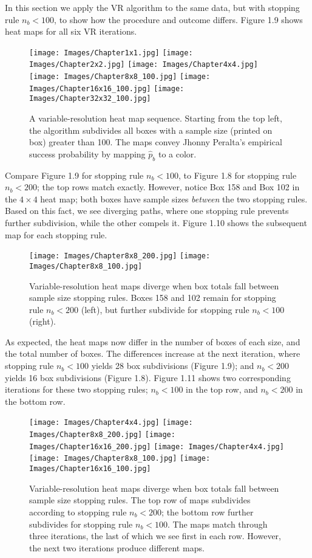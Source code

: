 In this section we apply the VR algorithm to the same data, but with stopping rule $n_{b} < 100$, to show how the procedure and outcome differs. Figure 1.9 shows heat maps for all six VR iterations.
        \begin{figure}[H]
      	\centering
      	\texttt{[image: Images/Chapter1x1.jpg]}
      	\texttt{[image: Images/Chapter2x2.jpg]}
      	\texttt{[image: Images/Chapter4x4.jpg]}
      	\texttt{[image: Images/Chapter8x8\_100.jpg]}
      	\texttt{[image: Images/Chapter16x16\_100.jpg]}
      	\texttt{[image: Images/Chapter32x32\_100.jpg]}
      	\caption{A variable-resolution heat map sequence. Starting from the top left, the algorithm subdivides all boxes with a sample size (printed on box) greater than 100. The maps convey Jhonny Peralta's empirical success probability by mapping $\hat{p}_{b}$ to a color.}
\end{figure} 	
Compare Figure 1.9 for stopping rule $n_{b} < 100$, to Figure 1.8 for stopping rule $n_{b} < 200$; the top rows match exactly. However, notice Box 158 and Box 102 in the $4 \times 4$ heat map; both boxes have sample sizes {\it between} the two stopping rules. Based on this fact, we see diverging paths, where one stopping rule prevents further subdivision, while the other compels it. Figure 1.10 shows the subsequent map for each stopping rule.
        \begin{figure}[H]
      	\centering      
      	\texttt{[image: Images/Chapter8x8\_200.jpg]}
      	\texttt{[image: Images/Chapter8x8\_100.jpg]}
      	\caption{Variable-resolution heat maps diverge when box totals fall between sample size stopping rules. Boxes 158 and 102 remain for stopping rule $n_{b} < 200$ (left), but further subdivide for stopping rule $n_{b} < 100$ (right).}
\end{figure} 
As expected, the heat maps now differ in the number of boxes of each size, and the total number of boxes. The differences increase at the next iteration, where stopping rule $n_{b} < 100$ yields 28 box subdivisions (Figure 1.9); and $n_{b} < 200$ yields 16 box subdivisions (Figure 1.8). Figure 1.11 shows two corresponding iterations for these two stopping rules; $n_{b} < 100$ in the top row, and $n_{b} < 200$ in the bottom row.
        \begin{figure}[H]
      	\centering      
      	\texttt{[image: Images/Chapter4x4.jpg]}
      	\texttt{[image: Images/Chapter8x8\_200.jpg]}
      	\texttt{[image: Images/Chapter16x16\_200.jpg]}
      	\texttt{[image: Images/Chapter4x4.jpg]}
      	\texttt{[image: Images/Chapter8x8\_100.jpg]}
      	\texttt{[image: Images/Chapter16x16\_100.jpg]}
      	\caption{Variable-resolution heat maps diverge when box totals fall between sample size stopping rules. The top row of maps subdivides according to stopping rule $n_{b} < 200$; the bottom row further subdivides for stopping rule $n_{b} < 100$. The maps match through three iterations, the last of which we see first in each row. However, the next two iterations produce different maps.}
\end{figure}
